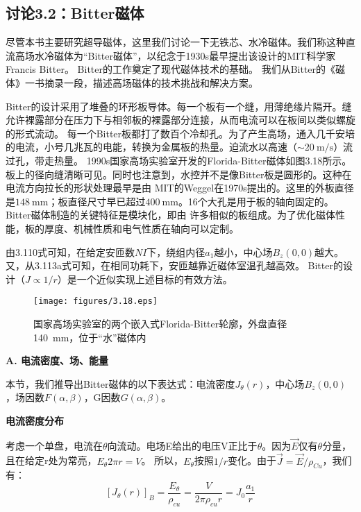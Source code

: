 \newpage
\subsection{讨论3.2：Bitter磁体}
尽管本书主要研究超导磁体，这里我们讨论一下无铁芯、水冷磁体。我们称这种直流高场水冷磁体为“Bitter磁体”，以纪念于1930s最早提出该设计的MIT科学家Francis Bitter。
Bitter的工作奠定了现代磁体技术的基础。
我们从Bitter的《磁体》一书摘录一段，描述高场磁体的技术挑战和解决方案。


Bitter的设计采用了堆叠的环形板导体。每一个板有一个缝，用薄绝缘片隔开。缝允许裸露部分在压力下与相邻板的裸露部分连接，从而电流可以在板间以类似螺旋的形式流动。
每一个Bitter板都打了数百个冷却孔。为了产生高场，通入几千安培的电流，小号几兆瓦的电能，转换为金属板的热量。迫流水以高速（$\sim 20\ \mathrm{m/s}$）流过孔，带走热量。
1990s国家高场实验室开发的Florida-Bitter磁体如图3.18所示。板上的径向缝清晰可见。同时也注意到，水控并不是像Bitter板是圆形的。这种在电流方向拉长的形状处理最早是由
MIT的Weggel在1970s提出的。这里的外板直径是$148\ \mathrm{mm}$；板直径尺寸早已超过$400\ \mathrm{mm}$。16个大孔是用于板的轴向固定的。Bitter磁体制造的关键特征是模块化，即由
许多相似的板组成。为了优化磁体性能，板的厚度、机械性质和电气性质在轴向可以定制。

由3.110式可知，在给定安匝数$NI$下，绕组内径$a_1$越小，中心场$B_z(0,0)$越大。又，从3.113a式可知，在相同功耗下，安匝越靠近磁体室温孔越高效。
Bitter的设计（$J\propto 1/r$）是一个近似实现上述目标的有效方法。

\begin{figure}[htbp]
  \centering
 \texttt{[image: figures/3.18.eps]}
  \caption{国家高场实验室的两个嵌入式Florida-Bitter轮廓，外盘直径140\ mm，位于“水”磁体内}
\end{figure}

\textbf{A. 电流密度、场、能量}

本节，我们推导出Bitter磁体的以下表达式：电流密度$J_\theta (r)$，中心场$B_z(0,0)$，场因数$F(\alpha,\beta)$，G因数$G(\alpha,\beta)$。

\textbf{电流密度分布}

考虑一个单盘，电流在$\theta$向流动。电场E给出的电压V正比于$\theta$。因为$\vec{E}$仅有$\theta$分量，且在给定r处为常亮，$E_\theta 2\pi r=V$。
所以，$E_\theta$按照$1/r$变化。由于$\vec{J}=\vec{E}/\rho_{Cu}$，我们有：
\begin{equation}
{[J_\theta(r)]}_B=\frac{E_{\theta}}{\rho_{cu}}=\frac{V}{2\pi\rho_{cu}r}=J_0\frac{a_1}{r}%
\end{equation}

